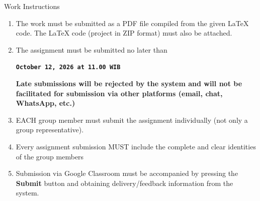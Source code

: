 \documentclass[a4paper,11pt]{article}
\newcommand{\tekskode}[1]{{\bf\large\texttt{#1}}}
\begin{document}
\begin{warnbox}{Work Instructions}
\begin{enumerate}
\begin{enumerate}
     Those of you in the non-IUP class can compile the \tekskode{TemplateTugas.tex} file in the \tekskode{Non IUP} folder
     \item Answers to the assignment questions \textbf{ALL} must be placed in the \tekskode{assignmentanswers.tex} file (for IUP) or \tekskode{jawaban.tex} (for non-IUP)
    \end{enumerate}
     \item The work must be submitted as a PDF file compiled from the given LaTeX code. The LaTeX code (project in ZIP format) must also be attached.
     \item The assignment must be submitted no later than
     \begin{tcolorbox}
     \center
     \tekskode{October 12, 2026 at 11.00 WIB}    
     \end{tcolorbox}
     \textbf{Late submissions will be rejected by the system and will not be facilitated for submission via other platforms (email, chat, WhatsApp, etc.)}
     \item EACH group member must submit the assignment individually (not only a group representative).
     \item Every assignment submission MUST include the complete and clear identities of the group members
     \item Submission via Google Classroom must be accompanied by pressing the \textbf{Submit} button and obtaining delivery/feedback information from the system.
\end{enumerate}
\end{warnbox}
\end{document}
